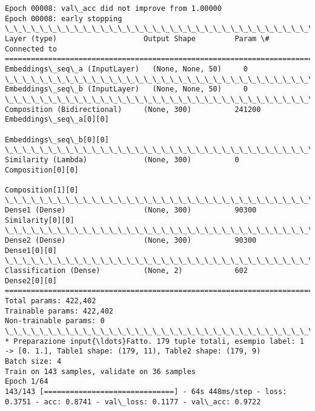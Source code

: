 \documentclass[11pt]{article}
\begin{document}
\begin{Verbatim}[commandchars=\\\{\}]
Epoch 00008: val\_acc did not improve from 1.00000
Epoch 00008: early stopping
\_\_\_\_\_\_\_\_\_\_\_\_\_\_\_\_\_\_\_\_\_\_\_\_\_\_\_\_\_\_\_\_\_\_\_\_\_\_\_\_\_\_\_\_\_\_\_\_\_\_\_\_\_\_\_\_\_\_\_\_\_\_\_\_\_\_\_\_\_\_\_\_\_\_\_\_\_\_\_\_\_\_\_\_\_\_\_\_\_\_\_\_\_\_\_\_\_\_
Layer (type)                    Output Shape         Param \#     Connected to                     
==================================================================================================
Embeddings\_seq\_a (InputLayer)   (None, None, 50)     0                                            
\_\_\_\_\_\_\_\_\_\_\_\_\_\_\_\_\_\_\_\_\_\_\_\_\_\_\_\_\_\_\_\_\_\_\_\_\_\_\_\_\_\_\_\_\_\_\_\_\_\_\_\_\_\_\_\_\_\_\_\_\_\_\_\_\_\_\_\_\_\_\_\_\_\_\_\_\_\_\_\_\_\_\_\_\_\_\_\_\_\_\_\_\_\_\_\_\_\_
Embeddings\_seq\_b (InputLayer)   (None, None, 50)     0                                            
\_\_\_\_\_\_\_\_\_\_\_\_\_\_\_\_\_\_\_\_\_\_\_\_\_\_\_\_\_\_\_\_\_\_\_\_\_\_\_\_\_\_\_\_\_\_\_\_\_\_\_\_\_\_\_\_\_\_\_\_\_\_\_\_\_\_\_\_\_\_\_\_\_\_\_\_\_\_\_\_\_\_\_\_\_\_\_\_\_\_\_\_\_\_\_\_\_\_
Composition (Bidirectional)     (None, 300)          241200      Embeddings\_seq\_a[0][0]           
                                                                 Embeddings\_seq\_b[0][0]           
\_\_\_\_\_\_\_\_\_\_\_\_\_\_\_\_\_\_\_\_\_\_\_\_\_\_\_\_\_\_\_\_\_\_\_\_\_\_\_\_\_\_\_\_\_\_\_\_\_\_\_\_\_\_\_\_\_\_\_\_\_\_\_\_\_\_\_\_\_\_\_\_\_\_\_\_\_\_\_\_\_\_\_\_\_\_\_\_\_\_\_\_\_\_\_\_\_\_
Similarity (Lambda)             (None, 300)          0           Composition[0][0]                
                                                                 Composition[1][0]                
\_\_\_\_\_\_\_\_\_\_\_\_\_\_\_\_\_\_\_\_\_\_\_\_\_\_\_\_\_\_\_\_\_\_\_\_\_\_\_\_\_\_\_\_\_\_\_\_\_\_\_\_\_\_\_\_\_\_\_\_\_\_\_\_\_\_\_\_\_\_\_\_\_\_\_\_\_\_\_\_\_\_\_\_\_\_\_\_\_\_\_\_\_\_\_\_\_\_
Dense1 (Dense)                  (None, 300)          90300       Similarity[0][0]                 
\_\_\_\_\_\_\_\_\_\_\_\_\_\_\_\_\_\_\_\_\_\_\_\_\_\_\_\_\_\_\_\_\_\_\_\_\_\_\_\_\_\_\_\_\_\_\_\_\_\_\_\_\_\_\_\_\_\_\_\_\_\_\_\_\_\_\_\_\_\_\_\_\_\_\_\_\_\_\_\_\_\_\_\_\_\_\_\_\_\_\_\_\_\_\_\_\_\_
Dense2 (Dense)                  (None, 300)          90300       Dense1[0][0]                     
\_\_\_\_\_\_\_\_\_\_\_\_\_\_\_\_\_\_\_\_\_\_\_\_\_\_\_\_\_\_\_\_\_\_\_\_\_\_\_\_\_\_\_\_\_\_\_\_\_\_\_\_\_\_\_\_\_\_\_\_\_\_\_\_\_\_\_\_\_\_\_\_\_\_\_\_\_\_\_\_\_\_\_\_\_\_\_\_\_\_\_\_\_\_\_\_\_\_
Classification (Dense)          (None, 2)            602         Dense2[0][0]                     
==================================================================================================
Total params: 422,402
Trainable params: 422,402
Non-trainable params: 0
\_\_\_\_\_\_\_\_\_\_\_\_\_\_\_\_\_\_\_\_\_\_\_\_\_\_\_\_\_\_\_\_\_\_\_\_\_\_\_\_\_\_\_\_\_\_\_\_\_\_\_\_\_\_\_\_\_\_\_\_\_\_\_\_\_\_\_\_\_\_\_\_\_\_\_\_\_\_\_\_\_\_\_\_\_\_\_\_\_\_\_\_\_\_\_\_\_\_
* Preparazione input{\ldots}Fatto. 179 tuple totali, esempio label: 1 -> [0. 1.], Table1 shape: (179, 11), Table2 shape: (179, 9)
Batch size: 4
Train on 143 samples, validate on 36 samples
Epoch 1/64
143/143 [==============================] - 64s 448ms/step - loss: 0.3751 - acc: 0.8741 - val\_loss: 0.1177 - val\_acc: 0.9722


\end{Verbatim}
\end{document}
